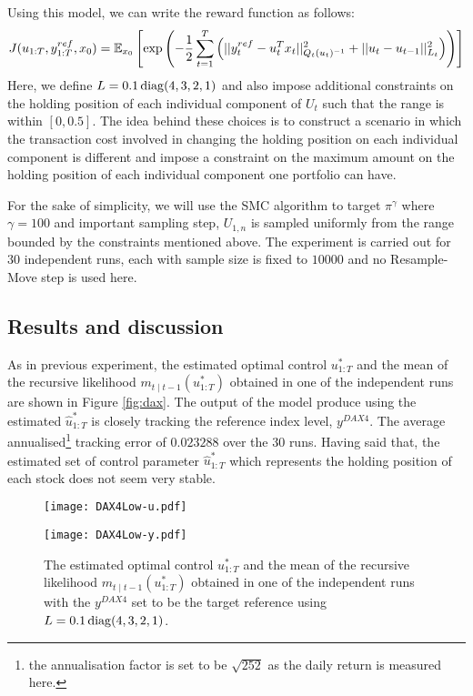 Using this model, we can write the reward function as follows:
\begin{equation}
  J(u_{1:T},y^{ref}_{1:T}, x_0) = \operatorname{\mathbb{E}}_{x_0}\left[ \exp \left( -\dfrac{1}{2}\displaystyle\sum^T_{t=1}\left(\vert\vert y^{ref}_t - u^T_tx_t \vert\vert^2_{Q_t(u_t)^{-1}}  + \vert\vert u_t - u_{t-1} \vert\vert^2_{L_t}\right) \right ) \right]
\end{equation}
Here, we define $L = 0.1\operatorname{diag}(4,3,2,1)$  and also impose additional constraints on the holding position of each individual component of $U_t$ such that the range is within $[0,0.5]$. The idea behind these choices is to construct a scenario in which the transaction cost involved in changing the holding position on each individual component is different and impose a constraint on the maximum amount on the holding position of each individual component one portfolio can have.

For the sake of simplicity, we will use the SMC algorithm to target $\pi^\gamma$ where $\gamma=100$ and important sampling step, $U_{1,n}$ is sampled uniformly from the range bounded by the constraints mentioned above. The experiment is carried out for $30$ independent runs, each with sample size is fixed to $10000$ and no Resample-Move step is used here.

\subsection{Results and discussion}
As in previous experiment, the estimated optimal control $u^*_{1:T}$ and the mean of the recursive likelihood $m_{t \mid t-1}(u^*_{1:T})$ obtained in one of the independent runs are shown in Figure \ref{fig:dax}.  The output of the model produce using the estimated $\hat{u}^*_{1:T}$ is closely tracking the reference index level, $y^{DAX4}$. The average annualised\footnote{the annualisation factor is set to be $\sqrt{252}$ as the daily return is measured here.} tracking error of $0.023288$ over the $30$ runs. Having said that, the estimated set of control parameter $\hat{u}^*_{1:T}$ which represents the holding position of each stock does not seem very stable.

\begin{figure}[tbp]
\centering
    \begin{minipage}{0.5\textwidth}
        \centering
        \texttt{[image: DAX4Low-u.pdf]}
    \end{minipage}%
    \begin{minipage}{0.5\textwidth}
        \centering
        \texttt{[image: DAX4Low-y.pdf]}
    \end{minipage}
\caption{The estimated optimal control $u^*_{1:T}$ and the mean of the recursive likelihood $m_{t \mid t-1}(u^*_{1:T})$ obtained in one of the independent runs with the $y^{DAX4}$ set to be the target reference using $L = 0.1\operatorname{diag}(4,3,2,1)$.}
\label{fig:dax4}
\end{figure}

